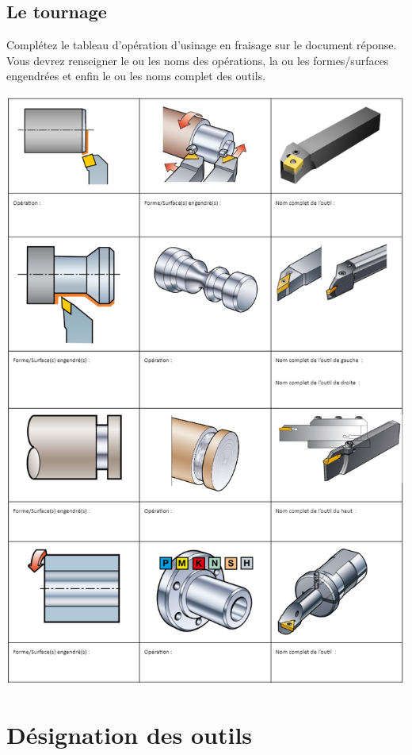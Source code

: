 \documentclass[12pt,a4paper]{article} %
\begin{document}
\subsection{Le tournage}
\begin{exo} Complétez le tableau d'opération d'usinage en fraisage sur le document réponse. Vous devrez renseigner le ou les noms des opérations, la ou les formes/surfaces engendrées et enfin le ou les noms complet des outils.  \end{exo}
\begin{center}
\includegraphics[scale=1.1]{TR1.png}
\end{center}



\section{Désignation des outils}
\end{document}
